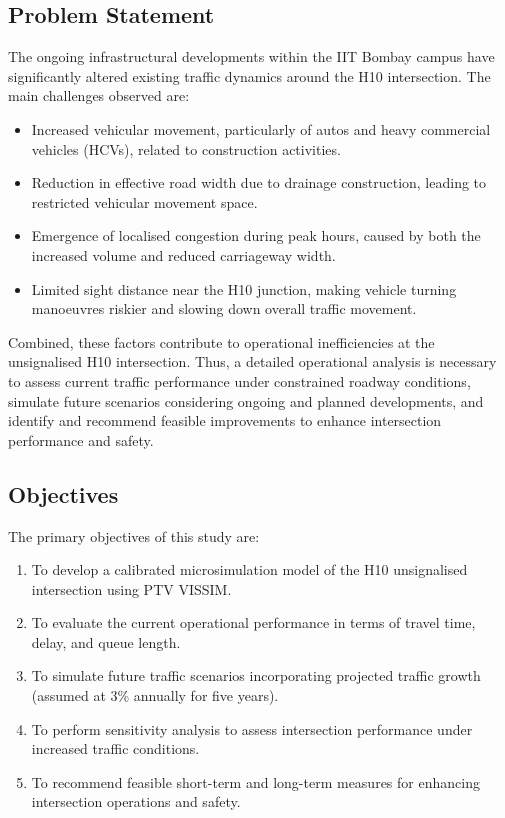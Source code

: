 \documentclass[11pt]{article}
\begin{document}
\subsection{Problem Statement}
The ongoing infrastructural developments within the IIT Bombay campus have significantly altered
existing traffic dynamics around the H10 intersection. The main challenges observed are:
\begin{itemize}
  \item Increased vehicular movement, particularly of autos and heavy commercial vehicles (HCVs),
  related to construction activities.
  \item Reduction in effective road width due to drainage construction, leading to restricted vehicular
  movement space.
  \item Emergence of localised congestion during peak hours, caused by both the increased volume and
  reduced carriageway width.
  \item Limited sight distance near the H10 junction, making vehicle turning manoeuvres riskier and
  slowing down overall traffic movement.
\end{itemize}
Combined, these factors contribute to operational inefficiencies at the unsignalised H10 intersection.
Thus, a detailed operational analysis is necessary to assess current traffic performance under
constrained roadway conditions, simulate future scenarios considering ongoing and planned developments,
and identify and recommend feasible improvements to enhance intersection performance and safety.

\subsection{Objectives}
The primary objectives of this study are:
\begin{enumerate}
  \item To develop a calibrated microsimulation model of the H10 unsignalised intersection using PTV
  VISSIM.
  \item To evaluate the current operational performance in terms of travel time, delay, and queue
  length.
  \item To simulate future traffic scenarios incorporating projected traffic growth (assumed at 3\%
  annually for five years).
  \item To perform sensitivity analysis to assess intersection performance under increased traffic
  conditions.
  \item To recommend feasible short-term and long-term measures for enhancing intersection operations
  and safety.
\end{enumerate}
\end{document}

